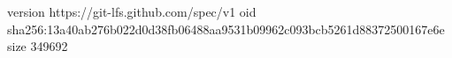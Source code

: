version https://git-lfs.github.com/spec/v1
oid sha256:13a40ab276b022d0d38fb06488aa9531b09962c093bcb5261d88372500167e6e
size 349692
